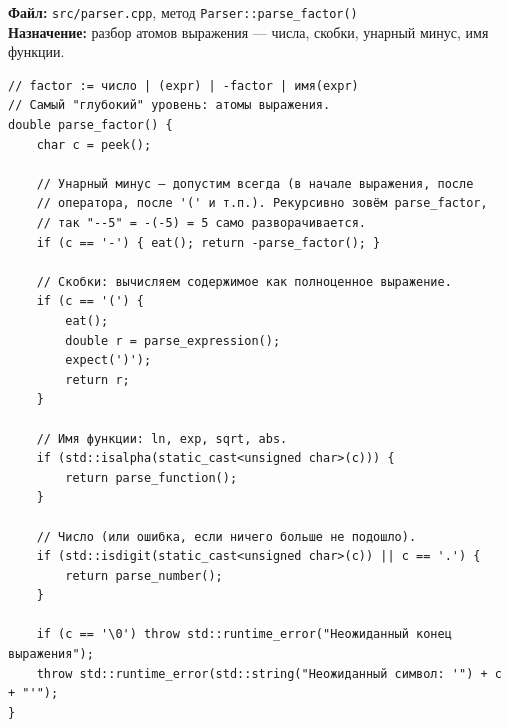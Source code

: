 



\noindent\textbf{Файл:} \texttt{src/parser.cpp}, метод \texttt{Parser::parse\_factor()}\\
\textbf{Назначение:} разбор атомов выражения --- числа, скобки, унарный минус, имя функции.

\begin{lstlisting}
// factor := число | (expr) | -factor | имя(expr)
// Самый "глубокий" уровень: атомы выражения.
double parse_factor() {
    char c = peek();

    // Унарный минус — допустим всегда (в начале выражения, после
    // оператора, после '(' и т.п.). Рекурсивно зовём parse_factor,
    // так "--5" = -(-5) = 5 само разворачивается.
    if (c == '-') { eat(); return -parse_factor(); }

    // Скобки: вычисляем содержимое как полноценное выражение.
    if (c == '(') {
        eat();
        double r = parse_expression();
        expect(')');
        return r;
    }

    // Имя функции: ln, exp, sqrt, abs.
    if (std::isalpha(static_cast<unsigned char>(c))) {
        return parse_function();
    }

    // Число (или ошибка, если ничего больше не подошло).
    if (std::isdigit(static_cast<unsigned char>(c)) || c == '.') {
        return parse_number();
    }

    if (c == '\0') throw std::runtime_error("Неожиданный конец выражения");
    throw std::runtime_error(std::string("Неожиданный символ: '") + c + "'");
}
\end{lstlisting}


